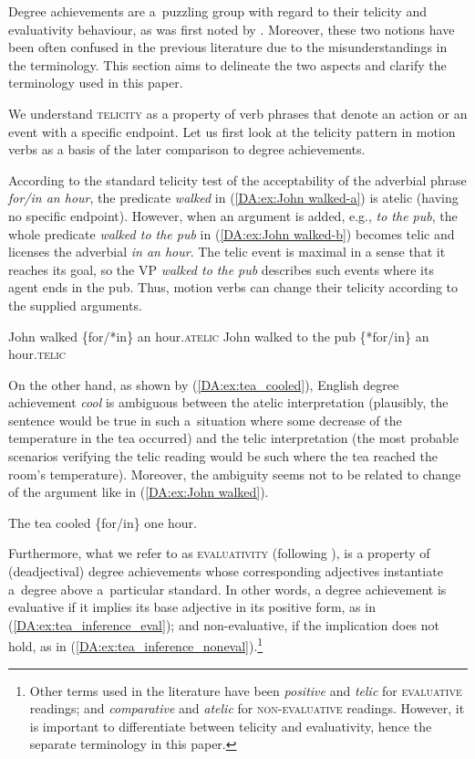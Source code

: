 \documentclass[output=paper]{langscibook}
\begin{document}
Degree achievements are a~puzzling group with regard to their telicity and evaluativity behaviour, as was first noted by \citet{dowty1979word}. Moreover, these two notions have been often confused in the previous literature due to the misunderstandings in the terminology. This section aims to delineate the two aspects and clarify the terminology used in this paper.

We understand \textsc{telicity} as a property of verb phrases that denote an action or an event with a specific endpoint. Let us first look at the telicity pattern in motion verbs as a basis of the later comparison to degree achievements.

According to the standard telicity test of the acceptability of the adverbial phrase \textit{for/in an hour}, the predicate \textit{walked} in (\ref{DA:ex:John walked-a}) is atelic (having no specific endpoint). However, when an argument is added, e.g., \textit{to the pub}, the whole predicate \textit{walked to the pub} in (\ref{DA:ex:John walked-b}) becomes telic and licenses the adverbial \textit{in an hour}. The telic event is maximal in a sense that it reaches its goal, so the VP \textit{walked to the pub} describes such events where its agent ends in the pub. Thus, motion verbs can change their telicity according to the supplied arguments.

\ea\label{DA:ex:John walked}
\ea John walked \{for/*in\} an hour.\hfill \textsc{atelic}\label{DA:ex:John walked-a}
\ex John walked to the pub \{*for/in\} an hour.\hfill \textsc{telic}\label{DA:ex:John walked-b}
\z\z

\noindent On the other hand, as shown by (\ref{DA:ex:tea_cooled}), English degree achievement \textit{cool} is ambiguous between the atelic interpretation (plausibly, the sentence would be true in such a~situation where some decrease of the temperature in the tea occurred) and the telic interpretation (the most probable scenarios verifying the telic reading would be such where the tea reached the room's temperature). Moreover, the ambiguity seems not to be related to change of the argument like in (\ref{DA:ex:John walked}).

\ea\label{DA:ex:tea_cooled}The tea cooled \{for/in\} one hour.
\z

\noindent Furthermore, what we refer to as \textsc{evaluativity} (following \cite{brasoveanu2018evaluativity}), is a property of (deadjectival) degree achievements whose corresponding adjectives instantiate a~degree above a~particular standard. In other words, a degree achievement is evaluative if it implies its base adjective in its positive form, as in (\ref{DA:ex:tea_inference_eval}); and non-evaluative, if the implication does not hold, as in (\ref{DA:ex:tea_inference_noneval}).\footnote{Other terms used in the literature have been \textit{positive} and \textit{telic} for \textsc{evaluative} readings; and \textit{comparative} and \textit{atelic} for \textsc{non-evaluative} readings. However, it is important to differentiate between telicity and evaluativity, hence the separate terminology in this paper.}
\end{document}
